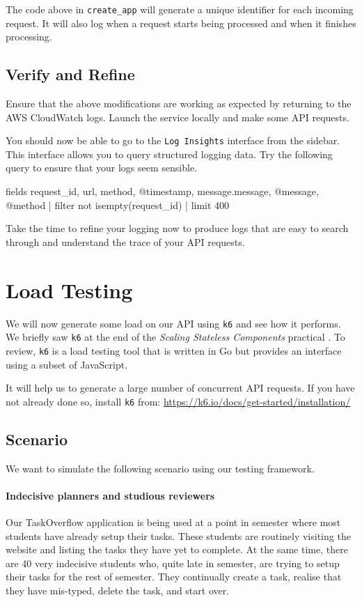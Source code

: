 \documentclass{csse4400}
\begin{document}
The code above in \texttt{create\_app} will generate a unique identifier for each incoming request.
It will also log when a request starts being processed and when it finishes processing.

\subsection{Verify and Refine}
Ensure that the above modifications are working as expected by returning to the AWS CloudWatch logs.
Launch the service locally and make some API requests.

You should now be able to go to the \texttt{Log Insights} interface from the sidebar.
This interface allows you to query structured logging data.
Try the following query to ensure that your logs seem sensible.
%
\begin{code}[numbers=none]{}
fields request_id, url, method, @timestamp, message.message, @message, @method
| filter not isempty(request_id)
| limit 400
\end{code}

Take the time to refine your logging now to produce logs that are easy to search through
and understand the trace of your API requests.


\section{Load Testing}

We will now generate some load on our API using \texttt{k6} and see how it performs.
We briefly saw \texttt{k6} at the end of the \textit{Scaling Stateless Components} practical \cite{prac-week6}.
To review, \texttt{k6} is a load testing tool that is written in Go but provides an interface using a subset of JavaScript.

It will help us to generate a large number of concurrent API requests.
If you have not already done so, install \texttt{k6} from:
\url{https://k6.io/docs/get-started/installation/}

\subsection{Scenario}
We want to simulate the following scenario using our testing framework.

\paragraph{Indecisive planners and studious reviewers}
Our TaskOverflow application is being used at a point in semester where most students have already setup their tasks.
These students are routinely visiting the website and listing the tasks they have yet to complete.
At the same time, there are 40 very indecisive students who,
quite late in semester,
are trying to setup their tasks for the rest of semester.
They continually create a task,
realise that they have mis-typed,
delete the task,
and start over.
\end{document}
